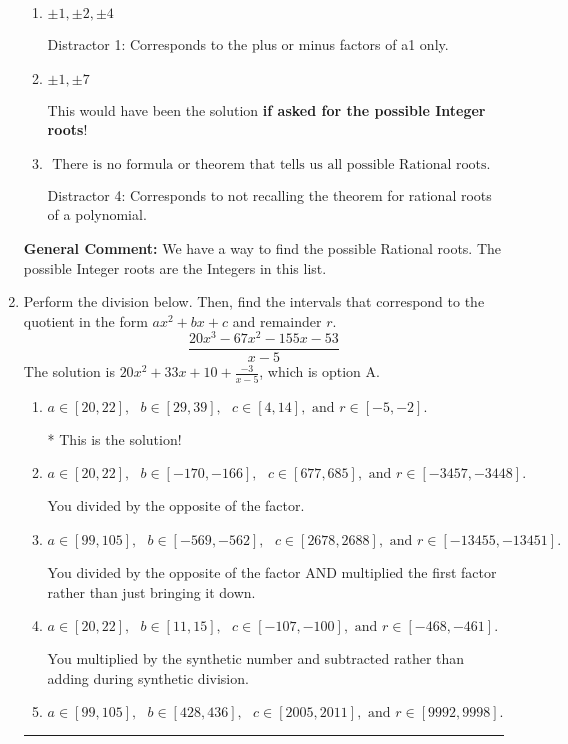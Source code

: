 \documentclass{extbook}[14pt]
\newcommand{\litem}[1]{\item #1

\rule{\textwidth}{0.4pt}}
\begin{document}
\begin{enumerate}
{\begin{enumerate}[label=\Alph*.]
 Distractor 3: Corresponds to the plus or minus of the inverse quotient (an/a0) of the factors. 
\item \( \pm 1,\pm 2,\pm 4 \)

 Distractor 1: Corresponds to the plus or minus factors of a1 only.
\item \( \pm 1,\pm 7 \)

This would have been the solution \textbf{if asked for the possible Integer roots}!
\item \( \text{ There is no formula or theorem that tells us all possible Rational roots.} \)

 Distractor 4: Corresponds to not recalling the theorem for rational roots of a polynomial.
\end{enumerate}

\textbf{General Comment:} We have a way to find the possible Rational roots. The possible Integer roots are the Integers in this list.
}
\litem{
Perform the division below. Then, find the intervals that correspond to the quotient in the form $ax^2+bx+c$ and remainder $r$.
\[ \frac{20x^{3} -67 x^{2} -155 x -53}{x -5} \]The solution is \( 20x^{2} +33 x + 10 + \frac{-3}{x -5} \), which is option A.\begin{enumerate}[label=\Alph*.]
\item \( a \in [20, 22], \text{   } b \in [29, 39], \text{   } c \in [4, 14], \text{   and   } r \in [-5, -2]. \)

* This is the solution!
\item \( a \in [20, 22], \text{   } b \in [-170, -166], \text{   } c \in [677, 685], \text{   and   } r \in [-3457, -3448]. \)

 You divided by the opposite of the factor.
\item \( a \in [99, 105], \text{   } b \in [-569, -562], \text{   } c \in [2678, 2688], \text{   and   } r \in [-13455, -13451]. \)

 You divided by the opposite of the factor AND multiplied the first factor rather than just bringing it down.
\item \( a \in [20, 22], \text{   } b \in [11, 15], \text{   } c \in [-107, -100], \text{   and   } r \in [-468, -461]. \)

 You multiplied by the synthetic number and subtracted rather than adding during synthetic division.
\item \( a \in [99, 105], \text{   } b \in [428, 436], \text{   } c \in [2005, 2011], \text{   and   } r \in [9992, 9998]. \)


\end{enumerate}}
\end{enumerate}
\end{document}
